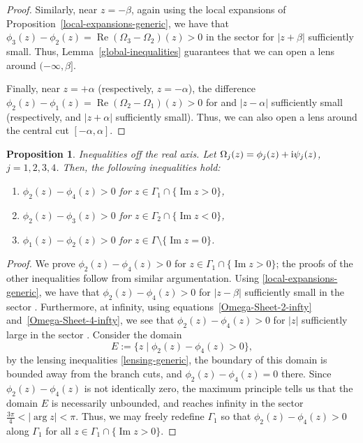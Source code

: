 \documentclass[10pt,a4paper]{amsart}
\numberwithin{equation}{section}
\newtheorem{Proposition}[Theorem]{Proposition}
 { \theoremstyle{definition}
\newtheorem{Definition}[Theorem]{Definition}
\newtheorem{Note}[Theorem]{Note}
\newtheorem{Example}[Theorem]{Example}
\newtheorem{Remark}[Theorem]{Remark} }
\begin{document}
\begin{proof}
 Similarly, near $z = -\beta$, again using the local expansions of Proposition~\ref{local-expansions-generic}, we have that $\phi_3(z) - \phi_2(z) = \operatorname{Re}(\Omega_3 - \Omega_2)(z) >0$ in the sector  for $|z+\beta|$ sufficiently small. Thus, Lemma~\ref{global-inequalities} guarantees that we can open a lens around $(-\infty,\beta]$.

 Finally, near $z = +\alpha$ (respectively, $z=-\alpha$), the difference $\phi_2(z) - \phi_1(z) = \operatorname{Re}(\Omega_2 - \Omega_1)(z) >0$ for 
 and $|z-\alpha|$ sufficiently small (respectively,  and $|z+\alpha|$ sufficiently small). Thus, we can also open a lens around the central cut $[-\alpha,\alpha]$.
 \end{proof}

\begin{Proposition}
 \textit{Inequalities off the real axis.}
 Let $\Omega_j(z) = \phi_j(z) + {\rm i}\psi_j(z)$, $j = 1,2,3,4$. Then, the following inequalities hold:
 \begin{enumerate}\itemsep=0pt
 \item[$(1)$] $\phi_2(z) - \phi_4(z) > 0$ for $z \in \Gamma_1 \cap \{\operatorname{Im} z > 0\}$,
 \item[$(2)$] $\phi_2(z) - \phi_3(z) > 0$ for $z \in \Gamma_2 \cap \{\operatorname{Im} z < 0\}$,
 \item[$(3)$] $\phi_1(z) - \phi_2(z) > 0$ for $z \in \Gamma \setminus \{\operatorname{Im} z = 0\}$.
 \end{enumerate}
\end{Proposition}
 \begin{proof}
 We prove $\phi_2(z) - \phi_4(z) > 0$ for $z \in \Gamma_1 \cap \{\operatorname{Im} z > 0\}$; the proofs of the other inequalities follow from similar
 argumentation. Using \eqref{local-expansions-generic}, we have that $\phi_2(z) - \phi_4(z) > 0$ for $|z-\beta|$ sufficiently small in the sector . Furthermore, at infinity, using equations~\eqref{Omega-Sheet-2-infty} and~\eqref{Omega-Sheet-4-infty}, we see that $\phi_2(z) - \phi_4(z) > 0$ for
 $|z|$ sufficiently large in the sector . Consider the domain
 \begin{equation*}
 E := \{z \mid \phi_2(z) - \phi_4(z) > 0 \},
 \end{equation*}
 by the lensing inequalities \eqref{lensing-generic}, the boundary of this domain is bounded away from the branch cuts,
 and $\phi_2(z) - \phi_4(z) = 0$ there. Since $\phi_2(z) - \phi_4(z)$ is not identically zero, the maximum principle tells us that the domain
 $E$ is necessarily unbounded, and reaches infinity in the sector $\frac{3\pi}{4} < |{\arg z}| < \pi$. Thus, we may freely redefine $\Gamma_1$ so that
 $\phi_2(z) - \phi_4(z) > 0$ along $\Gamma_1$ for all $z \in \Gamma_1 \cap \{\operatorname{Im} z > 0\}$.
 \end{proof}
\end{document}
